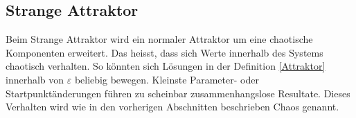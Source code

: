 \subsection{Strange Attraktor}
Beim Strange Attraktor wird ein normaler Attraktor um eine chaotische Komponenten erweitert. Das heisst, dass sich Werte innerhalb des Systems chaotisch verhalten. So könnten sich Lösungen in der Definition \eqref{Attraktor} innerhalb von $\varepsilon$ beliebig bewegen. Kleinste Parameter- oder Startpunktänderungen führen zu scheinbar zusammenhangslose Resultate. Dieses Verhalten wird wie in den vorherigen Abschnitten beschrieben Chaos genannt.
